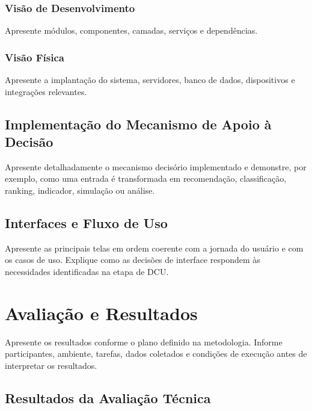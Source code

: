 \documentclass[12pt]{article}
\begin{document}
\subsubsection{Visão de Desenvolvimento}
Apresente módulos, componentes, camadas, serviços e dependências.

\subsubsection{Visão Física}
Apresente a implantação do sistema, servidores, banco de dados, dispositivos e integrações relevantes.

\subsection{Implementação do Mecanismo de Apoio à Decisão}

Apresente detalhadamente o mecanismo decisório implementado e demonstre, por exemplo, como uma entrada é transformada em recomendação, classificação, ranking, indicador, simulação ou análise.

\subsection{Interfaces e Fluxo de Uso}

Apresente as principais telas em ordem coerente com a jornada do usuário e com os casos de uso. Explique como as decisões de interface respondem às necessidades identificadas na etapa de DCU.


\section{Avaliação e Resultados}
\label{sec:resultados}

Apresente os resultados conforme o plano definido na metodologia. Informe participantes, ambiente, tarefas, dados coletados e condições de execução antes de interpretar os resultados.

\subsection{Resultados da Avaliação Técnica}
\end{document}
